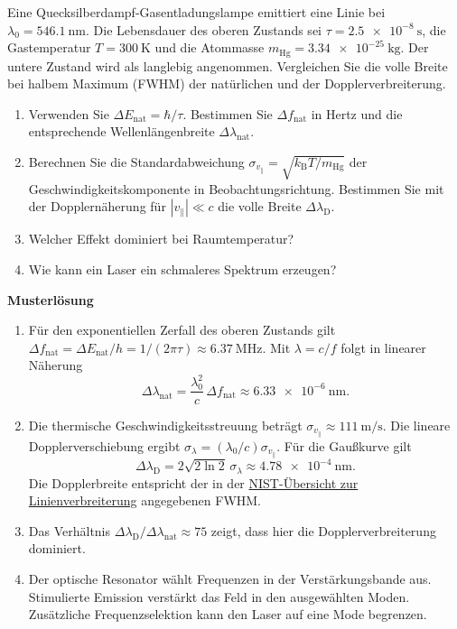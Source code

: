 \begin{ExerciseBlock}
Eine Quecksilberdampf-Gasentladungslampe emittiert eine Linie bei $\lambda_0=\qty{546.1}{\nano\metre}$. Die Lebensdauer des oberen Zustands sei $\tau=\qty{2.5e-8}{\second}$, die Gas­temperatur $T=\qty{300}{\kelvin}$ und die Atommasse $m_\mathrm{Hg}=\qty{3.34e-25}{\kilogram}$. Der untere Zustand wird als langlebig angenommen. Vergleichen Sie die volle Breite bei halbem Maximum (FWHM) der natürlichen und der Dopplerverbreiterung.
\begin{enumerate}
\item Verwenden Sie $\Delta E_\mathrm{nat}=\hbar/\tau$. Bestimmen Sie $\Delta f_\mathrm{nat}$ in Hertz und die entsprechende Wellenlängenbreite $\Delta\lambda_\mathrm{nat}$.
\item Berechnen Sie die Standardabweichung $\sigma_{v_\parallel}=\sqrt{k_\mathrm B T/m_\mathrm{Hg}}$ der Geschwindigkeitskomponente in Beobachtungsrichtung. Bestimmen Sie mit der Dopplernäherung für $|v_\parallel|\ll c$ die volle Breite $\Delta\lambda_\mathrm{D}$.
\item Welcher Effekt dominiert bei Raumtemperatur?
\item Wie kann ein Laser ein schmaleres Spektrum erzeugen?
\end{enumerate}
\end{ExerciseBlock}
\begin{Solution}
\par\medskip\noindent\textbf{Musterlösung}\par\nopagebreak[4]
\begin{enumerate}
\item Für den exponentiellen Zerfall des oberen Zustands gilt $\Delta f_\mathrm{nat}=\Delta E_\mathrm{nat}/h=1/(2\pi\tau)\approx\qty{6.37}{\mega\hertz}$. Mit $\lambda=c/f$ folgt in linearer Näherung
\[
 \Delta\lambda_\mathrm{nat}=\frac{\lambda_0^2}{c}\,\Delta f_\mathrm{nat}\approx\qty{6.33e-6}{\nano\metre}.
\]
\item Die thermische Geschwindigkeitsstreuung beträgt $\sigma_{v_\parallel}\approx\qty{111}{\metre\per\second}$. Die lineare Dopplerverschiebung ergibt $\sigma_\lambda=(\lambda_0/c)\sigma_{v_\parallel}$. Für die Gaußkurve gilt
\[
 \Delta\lambda_\mathrm{D}=2\sqrt{2\ln 2}\,\sigma_\lambda\approx\qty{4.78e-4}{\nano\metre}.
\]
Die Dopplerbreite entspricht der in der \href{https://physics.nist.gov/Pubs/AtSpec/node20.html}{NIST-Übersicht zur Linienverbreiterung} angegebenen FWHM.
\item Das Verhältnis $\Delta\lambda_\mathrm{D}/\Delta\lambda_\mathrm{nat}\approx75$ zeigt, dass hier die Dopplerverbreiterung dominiert.
\item Der optische Resonator wählt Frequenzen in der Verstärkungsbande aus. Stimulierte Emission verstärkt das Feld in den ausgewählten Moden. Zusätzliche Frequenzselektion kann den Laser auf eine Mode begrenzen.
\end{enumerate}
\end{Solution}
